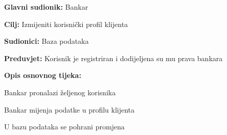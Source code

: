             \noindent {}
            \begin{packed_item}
            
              \item \textbf{Glavni sudionik: }Bankar
              \item  \textbf{Cilj:} Izmijeniti korisnički profil klijenta 
              \item  \textbf{Sudionici:} Baza podataka
              \item  \textbf{Preduvjet:} Korisnik je registriran i dodijeljena su mu prava bankara
              \item  \textbf{Opis osnovnog tijeka:}
              
              \item[] \begin{packed_enum}
            
                \item  Bankar pronalazi željenog korisnika
                \item  Bankar mijenja podatke u profilu klijenta
                \item  U bazu podataka se pohrani promjena 
              \end{packed_enum}
              
            \end{packed_item}
            
